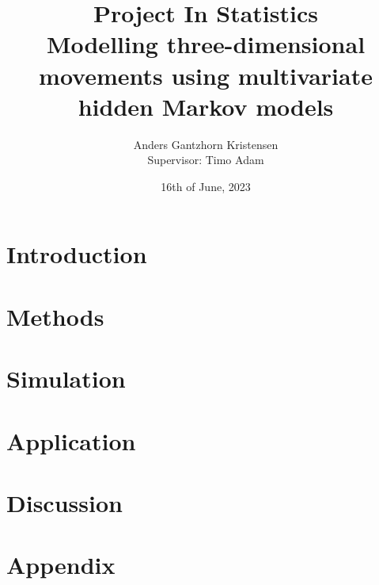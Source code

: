 \documentclass[11pt]{article}
\begin{document}
\pagestyle{fancy}
\fancyfoot{}
\fancyfoot[C]{\thepage}
\renewcommand{\headrulewidth}{0pt}
\renewcommand{\footrulewidth}{0pt}
\allowdisplaybreaks



\title{\vspace{-4cm}Project In Statistics\\
Modelling three-dimensional movements using
multivariate hidden Markov models}
\author{Anders Gantzhorn Kristensen\\
Supervisor: Timo Adam}
\date{16th of June, 2023}
\maketitle
\section*{Introduction}

\section*{Methods}

\section*{Simulation}

\section*{Application}

\section*{Discussion}


\newpage
\appendix
\section*{Appendix}

\end{document}
